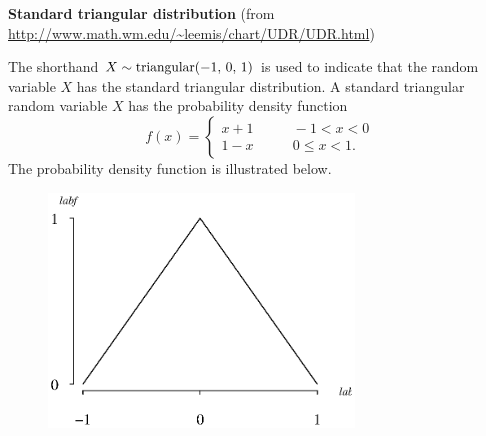 \documentclass[12pt,fullpage]{article}
\begin{document}
\noindent
{\bf Standard triangular distribution} (from \color{blue}\url{http://www.math.wm.edu/~leemis/chart/UDR/UDR.html}\color{black})

\noindent
The shorthand $X \sim {\rm triangular}(-1,\, 0,\, 1)$ is used to indicate that the
random variable $X$ has the standard triangular distribution.
A standard triangular random variable $X$ has the probability density function 
$$
f(x) = \left\{ \begin{array}{ll} 
       x +1 & \qquad -1 < x < 0 \\ [0.1in]
       1 - x & \qquad 0 \le x < 1.
       \end{array} \right. 
$$
The probability density function is illustrated below.
{\begin{figure}[h!]
\begin{center}
\includegraphics[width=3.2in]{StandardtriangularPlot.ps}
\end{center}
\end{figure}}
\end{document}
